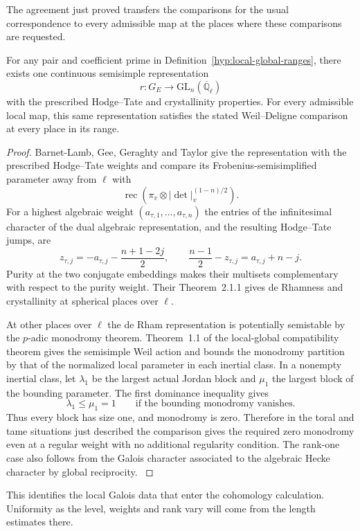 The agreement just proved transfers the comparisons
for the usual correspondence to every admissible map at
the places where these comparisons are requested.

\begin{proposition}\label{prop:simultaneous-local-global-attachment}
For any pair and coefficient prime in
Definition~\ref{hyp:local-global-ranges}, there exists one continuous semisimple representation 
\[
 r:G_E\longrightarrow\mathrm{GL}_n(\overline{\mathbb Q}_\ell)
\]
 with the prescribed Hodge--Tate and crystallinity properties. For every admissible local map, this same representation satisfies the stated Weil--Deligne comparison at every place in its range.
\end{proposition}

\begin{proof}

Barnet-Lamb, Gee, Geraghty and Taylor give the representation
with the prescribed Hodge--Tate weights and compare its
Frobenius-semisimplified parameter away from
\(\ell\) with
\[
             \operatorname{rec}(\pi_v\otimes
                              |\det|_v^{(1-n)/2}).
\]
For a highest algebraic weight \((a_{\tau,1},\ldots,a_{\tau,n})\)
the entries of the infinitesimal character of the dual
algebraic representation, and the resulting Hodge--Tate
jumps, are
\[
 z_{\tau,j}=-a_{\tau,j}-\frac{n+1-2j}{2},
 \qquad
 \frac{n-1}{2}-z_{\tau,j}=a_{\tau,j}+n-j .
\] Purity at the two conjugate embeddings
makes their multisets complementary with respect to the
purity weight. Their Theorem~2.1.1 gives de Rhamness and
crystallinity at spherical places over \(\ell\).
\hfill\mbox{\cite{blggt}}


At other places over \(\ell\) the de Rham representation is
potentially semistable by the \(p\)-adic monodromy theorem.
Theorem~1.1 of the local-global compatibility theorem gives
the semisimple Weil action and bounds the monodromy
partition by that of the normalized local parameter in
each inertial class. In a nonempty inertial class, let \(\lambda_1\) be the largest
actual Jordan block and \(\mu_1\) the largest block of the bounding
parameter. The first dominance inequality gives
\[
    \lambda_1\le\mu_1=1
      \qquad\text{if the bounding monodromy vanishes}.
\]
Thus every block has size one, and monodromy is zero. Therefore in the toral and
tame situations just described the comparison gives the
required zero monodromy even at a regular weight with no
additional regularity condition. The rank-one case also
follows from the Galois character associated to the
algebraic Hecke character by global reciprocity.
\hfill\mbox{\cite{blggt-lg}}

\end{proof}

This identifies the local Galois data that enter the cohomology calculation.
Uniformity as the level, weights and rank vary will come from the length estimates
there.
